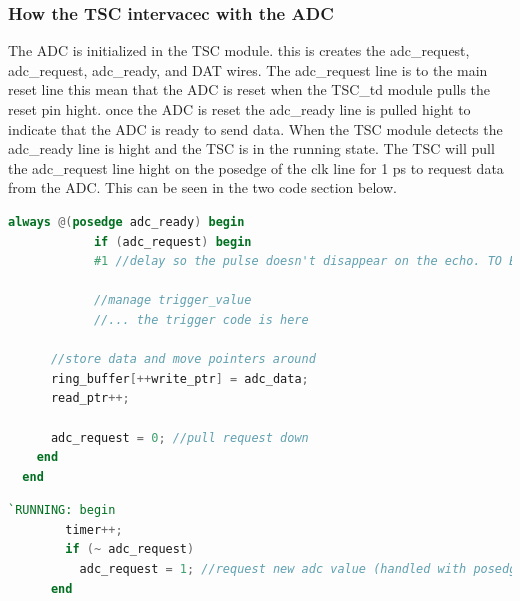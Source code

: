 \subsubsection{How the TSC intervacec with the ADC}
The ADC is initialized in the TSC module. this is creates the adc\_request, adc\_request,  adc\_ready, and DAT wires.
The adc\_request line is to the main reset line this mean that the ADC is reset when the TSC\_td module pulls the reset pin hight.
once the ADC is reset the adc\_ready line is pulled hight to indicate that the ADC is ready to send data.
When the TSC module detects the adc\_ready line is hight and the TSC is in the running state.
The TSC will pull the adc\_request line hight on  the posedge of the clk line for 1 ps to request data from the ADC. This can be seen in the two code section below.

\begin{lstlisting}[language=Verilog, caption={Code for storing data and moving pointers i the posedge adc\_ready}]
      always @(posedge adc_ready) begin
            if (adc_request) begin
            #1 //delay so the pulse doesn't disappear on the echo. TO BE REMOVED
          
            //manage trigger_value
            //... the trigger code is here

      //store data and move pointers around
      ring_buffer[++write_ptr] = adc_data;
      read_ptr++;

      adc_request = 0; //pull request down
    end
  end
\end{lstlisting}

\begin{lstlisting}[language=Verilog, caption={Code for requesting data from the ADC on posedge of the clock when in RUNNING state}]
      `RUNNING: begin
        timer++;
        if (~ adc_request)
          adc_request = 1; //request new adc value (handled with posedge adc_ready)
      end
\end{lstlisting}














